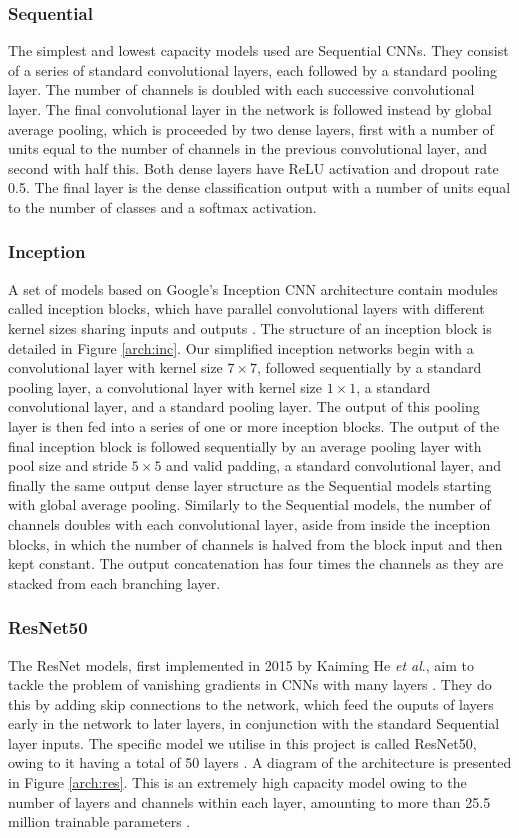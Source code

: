 \documentclass[12pt]{article}
\begin{document}
\subsubsection{Sequential}
The simplest and lowest capacity models used are Sequential CNNs. They consist of a series of standard convolutional layers, each followed by a standard pooling layer. The number of channels is doubled with each successive convolutional layer. The final convolutional layer in the network is followed instead by global average pooling, which is proceeded by two dense layers, first with a number of units equal to the number of channels in the previous convolutional layer, and second with half this. Both dense layers have ReLU activation and dropout rate 0.5. The final layer is the dense classification output with a number of units equal to the number of classes and a softmax activation.

\subsubsection{Inception}
A set of models based on Google's Inception CNN architecture contain modules called inception blocks, which have parallel convolutional layers with different kernel sizes sharing inputs and outputs \cite{Szegedy15}. The structure of an inception block is detailed in Figure \ref{arch:inc}. Our simplified inception networks begin with a convolutional layer with kernel size $7\times7$, followed sequentially by a standard pooling layer, a convolutional layer with kernel size $1\times1$, a standard convolutional layer, and a standard pooling layer. The output of this pooling layer is then fed into a series of one or more inception blocks. The output of the final inception block is followed sequentially by an average pooling layer with pool size and stride $5\times5$ and valid padding, a standard convolutional layer, and finally the same output dense layer structure as the Sequential models starting with global average pooling. Similarly to the Sequential models, the number of channels doubles with each convolutional layer, aside from inside the inception blocks, in which the number of channels is halved from the block input and then kept constant. The output concatenation has four times the channels as they are stacked from each branching layer.

\subsubsection{ResNet50}
The ResNet models, first implemented in 2015 by Kaiming He \textit{et al}., aim to tackle the problem of vanishing gradients in CNNs with many layers \cite{He15}. They do this by adding skip connections to the network, which feed the ouputs of layers early in the network to later layers, in conjunction with the standard Sequential layer inputs. The specific model we utilise in this project is called ResNet50, owing to it having a total of 50 layers \cite{He15}. A diagram of the architecture is presented in Figure \ref{arch:res}. This is an extremely high capacity model owing to the number of layers and channels within each layer, amounting to more than 25.5 million trainable parameters \cite{He15}.
\end{document}
